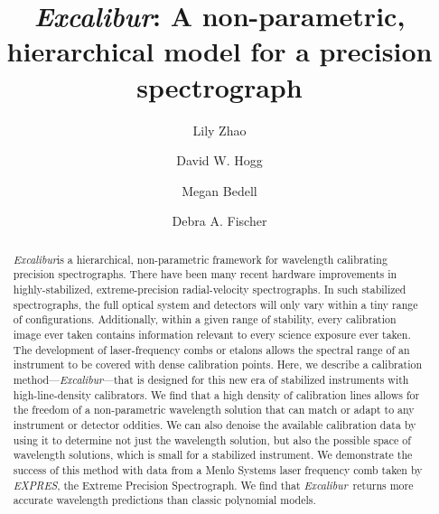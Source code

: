 \documentclass[twocolumn]{aastex63}
\newcommand{\project}[1]{\textsl{#1}}
\newcommand{\name}{\project{Excalibur}}
\newcommand{\acronym}[1]{{\small{#1}}}
\newcommand{\expres}{\project{\acronym{EXPRES}}}
\begin{document}
\title{\name:
A non-parametric, hierarchical model for a precision spectrograph}


\author[0000-0002-3852-3590]{Lily Zhao}

\author[0000-0003-2866-9403]{David W. Hogg}

\author[0000-0001-9907-7742]{Megan Bedell}

\author[0000-0003-2221-0861]{Debra A. Fischer}

\begin{abstract}
\name is a hierarchical, non-parametric framework for wavelength calibrating precision spectrographs.  There have been many recent hardware improvements in highly-stabilized, extreme-precision radial-velocity spectrographs.  In such stabilized spectrographs, the full optical system and detectors will only vary within a tiny range of configurations.  Additionally, within a given range of stability, every calibration image ever taken contains information relevant to every science exposure ever taken.  The development of laser-frequency combs or etalons allows the spectral range of an instrument to be covered with dense calibration points.  Here, we describe a calibration method---\name---that is designed for this new era of stabilized instruments with high-line-density calibrators.  We find that a high density of calibration lines allows for the freedom of a non-parametric wavelength solution that can match or adapt to any instrument or detector oddities.  We can also denoise the available calibration data by using it to determine not just the wavelength solution, but also the possible space of wavelength solutions, which is small for a stabilized instrument.  We demonstrate the success of this method with data from a Menlo Systems laser frequency comb taken by \expres, the Extreme Precision Spectrograph.  We find that \name\ returns more accurate wavelength predictions than classic polynomial models.
\end{abstract}
\end{document}
